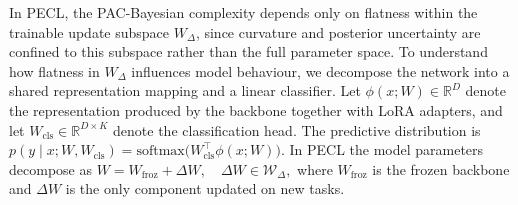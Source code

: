 \documentclass[10pt]{article} %
\begin{document}
In PECL, the PAC-Bayesian complexity depends only on flatness within the trainable update subspace $W_\Delta$, since curvature and posterior uncertainty are confined to this subspace rather than the full parameter space.
To understand how flatness in $W_\Delta$ influences model behaviour, we decompose the network into a
shared representation mapping and a linear classifier. Let
$
\phi(x; W) \in \mathbb{R}^D
$
denote the representation produced by the backbone together with LoRA adapters, and let
$W_{\mathrm{cls}} \in \mathbb{R}^{D \times K}$ denote the classification head. The predictive distribution is
$
p(y \mid x; W, W_{\mathrm{cls}})
=
\mathrm{softmax}\big(W_{\mathrm{cls}}^\top \phi(x; W)\big).
$
In PECL the model parameters decompose as
$
W = W_{\mathrm{froz}} + \Delta W,
\quad
\Delta W \in \mathcal{W}_\Delta,
$
where $W_{\mathrm{froz}}$ is the frozen backbone and $\Delta W$ is the only component updated on new tasks.
\end{document}
